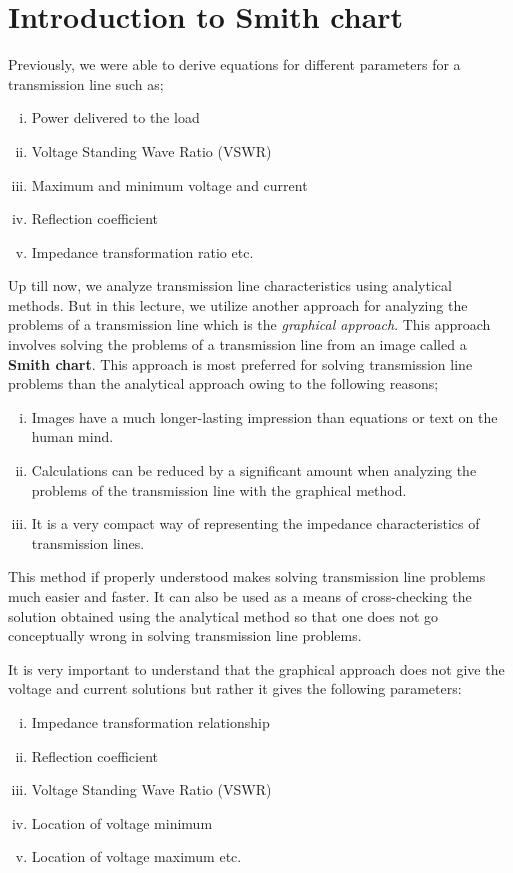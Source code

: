 \section{Introduction to Smith chart}\label{lec:lec7}
Previously, we were able to derive equations for different parameters for a transmission line such as;
\begin{enumerate}[(i)]
\item 	Power delivered to the load
\item	Voltage Standing Wave Ratio (VSWR)
\item	Maximum and minimum voltage and current
\item	Reflection coefficient
\item	Impedance transformation ratio etc.
\end{enumerate}

Up till now, we analyze transmission line characteristics using analytical methods. But in this lecture, we utilize another approach for analyzing the problems of a transmission line which is the \emph{graphical approach}. This approach involves solving the problems of a transmission line from an image called a \textbf{Smith chart}. This approach is most preferred for solving transmission line problems than the analytical approach owing to the following reasons;
\begin{enumerate}[(i)]
\item Images have a much longer-lasting impression than equations or text on the human mind.
\item Calculations can be reduced by a significant amount when analyzing the problems of the transmission line with the graphical method.
\item It is a very compact way of representing the impedance characteristics of transmission lines.
\end{enumerate}

This method if properly understood makes solving transmission line problems much easier and faster. It can also be used as a means of cross-checking the solution obtained using the analytical method so that one does not go conceptually wrong in solving transmission line problems.

It is very important to understand that the graphical approach does not give the voltage and current solutions but rather it gives the following parameters:
\begin{enumerate}[(i)]
\item Impedance transformation relationship 
\item Reflection coefficient
\item Voltage Standing Wave Ratio (VSWR)
\item Location of voltage minimum
\item Location of voltage maximum etc.
\end{enumerate}

